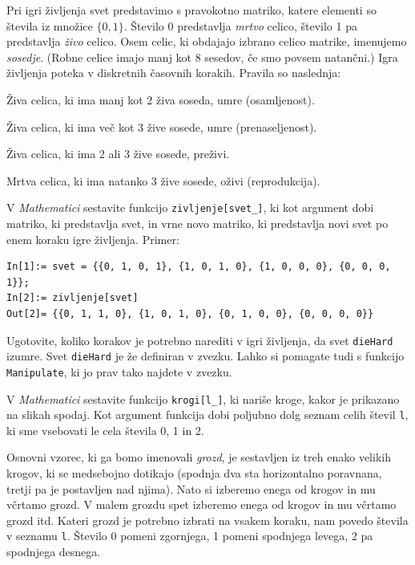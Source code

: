 \documentclass[arhiv]{../izpit}
\begin{document}

Pri igri življenja svet predstavimo s pravokotno matriko, katere elementi so števila iz množice $\{0, 1\}$. Število 0 predstavlja \emph{mrtvo} celico, število 1 pa predstavlja \emph{živo} celico. Osem celic, ki obdajajo izbrano celico matrike, imenujemo \emph{sosedje}. (Robne celice imajo manj kot 8 sesedov, če smo povsem natančni.) Igra življenja poteka v diskretnih časovnih korakih. Pravila so naslednja:
\vspace{\baselineskip}

\begin{compactitem}
\item Živa celica, ki ima manj kot 2 živa soseda, umre (osamljenost).
\item Živa celica, ki ima več kot 3 žive sosede, umre (prenaseljenost).
\item Živa celica, ki ima 2 ali 3 žive sosede, preživi.
\item Mrtva celica, ki ima natanko 3 žive sosede, oživi (reprodukcija).
\end{compactitem}

\podnaloga[20 točk]
\noindent V \emph{Mathematici} sestavite funkcijo \texttt{zivljenje[svet\_]}, ki kot argument dobi matriko, ki pred\-stav\-lja svet, in vrne novo matriko, ki predstavlja novi svet po enem koraku igre življenja. Primer:
%
\begin{verbatim}
In[1]:= svet = {{0, 1, 0, 1}, {1, 0, 1, 0}, {1, 0, 0, 0}, {0, 0, 0, 1}};
In[2]:= zivljenje[svet]
Out[2]= {{0, 1, 1, 0}, {1, 0, 1, 0}, {0, 1, 0, 0}, {0, 0, 0, 0}}
\end{verbatim}

\podnaloga[5 točk]
Ugotovite, koliko korakov je potrebno narediti v igri življenja, da svet \texttt{dieHard} izumre. Svet \texttt{dieHard} je že definiran v zvezku. Lahko si pomagate tudi s funkcijo \texttt{Manipulate}, ki jo prav tako najdete v zvezku.


V \emph{Mathematici} sestavite funkcijo \texttt{krogi[l\_]}, ki nariše kroge, kakor je prikazano na slikah spodaj. Kot argument funkcija dobi poljubno dolg seznam celih števil \texttt{l}, ki sme vsebovati le cela števila 0, 1 in 2.

Osnovni vzorec, ki ga bomo imenovali \emph{grozd}, je sestavljen iz treh enako velikih krogov, ki se medsebojno dotikajo (spodnja dva sta horizontalno poravnana, tretji pa je postavljen nad njima). Nato si izberemo enega od krogov in mu včrtamo grozd. V malem grozdu spet izberemo enega od krogov in mu včrtamo grozd itd. Kateri grozd je potrebno izbrati na vsakem koraku, nam povedo števila v seznamu \texttt{l}. Število 0 pomeni zgornjega, 1 pomeni spodnjega levega, 2 pa spodnjega desnega.
\end{document}
